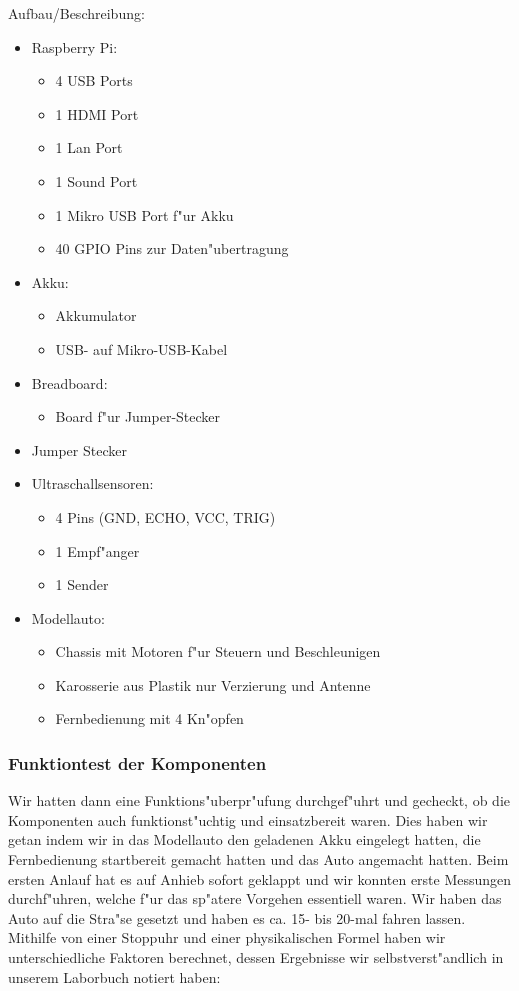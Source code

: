 \documentclass[a4paper,12pt]{article}
\newenvironment{myitemize}{
	\begin{itemize}
		\setlength{\itemsep}{0pt}
		\setlength{\parskip}{0pt}
		\setlength{\parsep}{0pt}
}
{
	\end{itemize}
}
\begin{document}
Aufbau/Beschreibung:
\begin{myitemize}
	\item Raspberry Pi:
	\begin{myitemize}
		\item 4 USB Ports
		\item 1 HDMI Port
		\item 1 Lan Port
		\item 1 Sound Port
		\item 1 Mikro USB Port  f"ur Akku
		\item 40 GPIO Pins zur Daten"ubertragung
	\end{myitemize}
	\item Akku:
	\begin{myitemize}
		\item Akkumulator
		\item USB- auf Mikro-USB-Kabel
	\end{myitemize}
	\item Breadboard:
	\begin{myitemize}
		\item Board f"ur Jumper-Stecker
	\end{myitemize}
	\item Jumper Stecker
	\item Ultraschallsensoren:
	\begin{myitemize}
		\item 4 Pins (GND, ECHO, VCC, TRIG)
		\item 1 Empf"anger
		\item 1 Sender
	\end{myitemize}
	\item Modellauto:
	\begin{myitemize}
		\item Chassis mit Motoren f"ur Steuern und Beschleunigen
		\item Karosserie aus Plastik nur Verzierung und Antenne
		\item Fernbedienung mit 4 Kn"opfen
	\end{myitemize}
\end{myitemize}

\subsubsection{Funktiontest der Komponenten}\label{sec2.1.2}

Wir hatten dann eine Funktions"uberpr"ufung durchgef"uhrt und gecheckt, ob die Komponenten auch funktionst"uchtig und einsatzbereit waren.
Dies haben wir getan indem wir in das Modellauto den geladenen Akku eingelegt hatten, die Fernbedienung startbereit gemacht hatten und das Auto angemacht hatten.
Beim ersten Anlauf hat es auf Anhieb sofort geklappt und wir konnten erste Messungen durchf"uhren, welche f"ur das sp"atere Vorgehen essentiell waren.
Wir haben das Auto auf die Stra"se gesetzt und haben es ca. 15- bis 20-mal fahren lassen.
Mithilfe von einer Stoppuhr und einer physikalischen Formel haben wir unterschiedliche Faktoren berechnet, dessen Ergebnisse wir selbstverst"andlich in unserem Laborbuch notiert haben:
\end{document}
